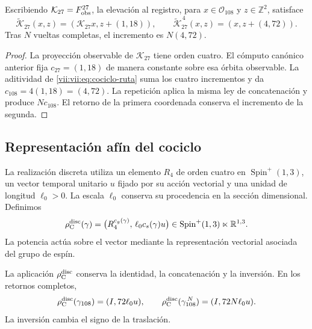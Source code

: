 \begin{proposition}
\label{vii:vii:prop:memoria-vuelta-completa}
Escribiendo \(\mathcal K_{27}=F_{\rm obs}^{27}\), la elevación
al registro, para \(x\in\mathcal O_{108}\) y \(z\in\mathbb Z^2\), satisface
\[
 \widetilde{\mathcal K}_{27}(x,z)
   =(\mathcal K_{27}x,z+(1,18)),\qquad
 \widetilde{\mathcal K}_{27}^{\,4}(x,z)
   =(x,z+(4,72)).
\]
Tras \(N\) vueltas completas, el incremento es \(N(4,72)\).
\end{proposition}

\begin{proof}
La proyección observable de \(\mathcal K_{27}\) tiene orden cuatro.
El cómputo canónico anterior fija \(c_{27}=(1,18)\) de manera constante
sobre esa órbita observable. La aditividad de
\eqref{vii:vii:eq:cociclo-ruta} suma los cuatro incrementos y da
\(c_{108}=4(1,18)=(4,72)\).
La repetición aplica la misma ley de concatenación y produce
\(Nc_{108}\). El retorno de la primera coordenada conserva el
incremento de la segunda.
\end{proof}

\subsection{Representación afín del cociclo}
\label{vii:vii:subsec:representacion-afin-cociclo}

La realización discreta utiliza un elemento \(R_4\) de orden cuatro en
\(\operatorname{Spin}^+(1,3)\), un vector temporal unitario \(u\)
fijado por su acción vectorial y una unidad de longitud \(\ell_0>0\).
La escala \(\ell_0\) conserva su procedencia en la sección dimensional.
Definimos
\begin{equation}
 \rho_{\rm C}^{\rm disc}(\gamma)=
 \bigl(R_4^{c_g(\gamma)},\,\ell_0c_s(\gamma)u\bigr)
 \in\operatorname{Spin}^+(1,3)\ltimes\mathbb R^{1,3}.
 \label{vii:vii:eq:representacion-discreta-memoria}
\end{equation}
La potencia actúa sobre el vector mediante la representación vectorial
asociada del grupo de espín.

\begin{theorem}
\label{vii:vii:thm:traslacion-memoria}
La aplicación \(\rho_{\rm C}^{\rm disc}\) conserva la identidad,
la concatenación y la inversión. En los retornos completos,
\begin{equation}
 \rho_{\rm C}^{\rm disc}(\gamma_{108})=(I,72\ell_0u),\qquad
 \rho_{\rm C}^{\rm disc}(\gamma_{108}^{\,N})=(I,72N\ell_0u).
 \label{vii:vii:eq:traslacion-retorno-108}
\end{equation}
La inversión cambia el signo de la traslación.
\end{theorem}

